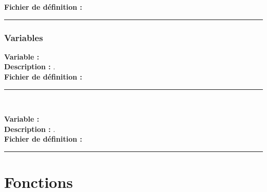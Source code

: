 \documentclass[a4paper,10pt]{article}
\begin{document}
    \textbf{Fichier de définition :} \textbf{\color{path}\color{text}}\\[1\baselineskip]



    \color{sec3}\par\noindent\rule{\textwidth}{0.4pt}\color{text}

    \color{sec3}
    \subsubsection{Variables}\color{text}

    \textbf{Variable :} \textbf{\color{vars}\color{text}}\\[1\baselineskip]

    \textbf{Description :} .\\[1\baselineskip]

    \textbf{Fichier de définition :} \textbf{\color{path}\color{text}}\\[1\baselineskip]




    \color{vars}\par\noindent\rule{\textwidth}{0.4pt}\\[1\baselineskip]\color{text}

    \textbf{Variable :} \textbf{\color{vars}\color{text}}\\[1\baselineskip]

    \textbf{Description :} .\\[1\baselineskip]

    \textbf{Fichier de définition :} \textbf{\color{path}\color{text}}\\[1\baselineskip]





    \color{sec1}\par\noindent\rule{\textwidth}{0.4pt}\color{text}

    \color{sec1}
    \section{Fonctions}\color{text}

    \color{sec2}
    \subsection{}\color{text}
\end{document}
